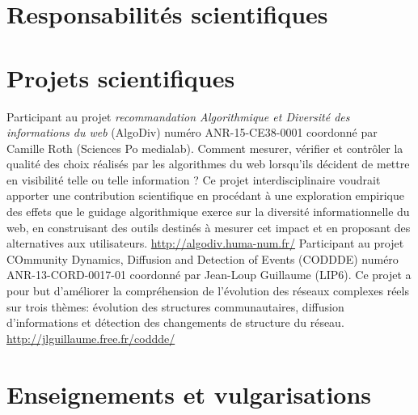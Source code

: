 \documentclass[11pt,a4paper]{moderncv}
\begin{document}

\section{Responsabilités scientifiques}

\section{Projets scientifiques}
 {Participant au projet \emph{recommandation Algorithmique et Diversité des informations du web} (AlgoDiv) numéro ANR-15-CE38-0001 coordonné par Camille Roth (Sciences Po medialab).\newline
Comment mesurer, vérifier et contrôler la qualité des choix réalisés par les algorithmes du web lorsqu’ils décident de mettre en visibilité telle ou telle information ? Ce projet interdisciplinaire voudrait apporter une contribution scientifique  en procédant à une exploration empirique des effets que le guidage algorithmique exerce sur la diversité informationnelle du web, en construisant des outils destinés à mesurer cet impact et en proposant des alternatives aux utilisateurs.
 \url{http://algodiv.huma-num.fr/}}
 {Participant au projet COmmunity Dynamics, Diffusion and Detection of Events (CODDDE) numéro ANR-13-CORD-0017-01 coordonné par Jean-Loup Guillaume (LIP6).\newline
Ce projet a pour but d'améliorer la compréhension de l'évolution des réseaux complexes réels sur trois thèmes: évolution des structures communautaires, diffusion d'informations et détection des changements de structure du réseau. \url{http://jlguillaume.free.fr/coddde/}}
\clearpage
\section{Enseignements et vulgarisations}
\end{document}
